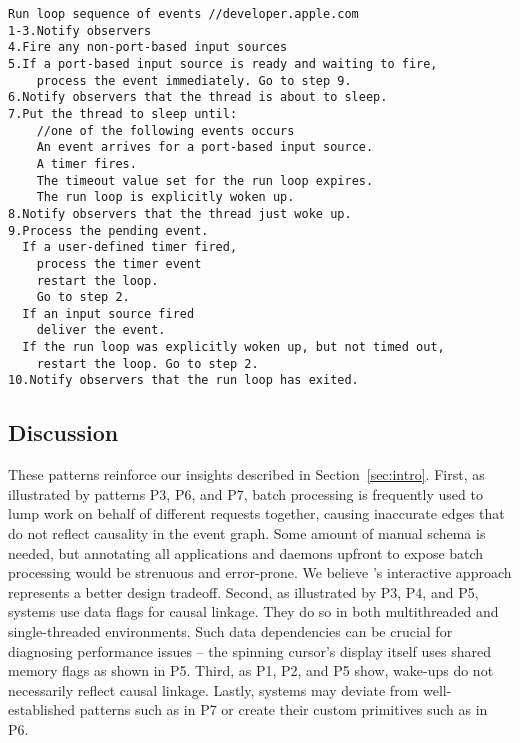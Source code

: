 
{\footnotesize \begin{verbatim}
Run loop sequence of events //developer.apple.com
1-3.Notify observers
4.Fire any non-port-based input sources
5.If a port-based input source is ready and waiting to fire,
    process the event immediately. Go to step 9.
6.Notify observers that the thread is about to sleep.
7.Put the thread to sleep until:
    //one of the following events occurs
    An event arrives for a port-based input source.
    A timer fires.
    The timeout value set for the run loop expires.
    The run loop is explicitly woken up.
8.Notify observers that the thread just woke up.
9.Process the pending event.
  If a user-defined timer fired,
    process the timer event
    restart the loop.
    Go to step 2.
  If an input source fired
    deliver the event.
  If the run loop was explicitly woken up, but not timed out,
    restart the loop. Go to step 2.
10.Notify observers that the run loop has exited.

\end{verbatim}
}




\subsection{Discussion}

These patterns reinforce our insights described in
Section~\ref{sec:intro}.  First, as illustrated by patterns P3, P6, and
P7, batch processing is frequently used to lump work on behalf of
different requests together, causing inaccurate edges that do not reflect
causality in the event graph.  Some amount of manual schema is needed, but
annotating all applications and daemons upfront to expose batch processing
would be strenuous and error-prone.  We believe \xxx's interactive
approach represents a better design tradeoff.  Second, as illustrated by
P3, P4, and P5, systems use data flags for causal linkage.  They do so in
both multithreaded and single-threaded environments.  Such data
dependencies can be crucial for diagnosing performance issues -- the
spinning cursor's display itself uses shared memory flags as shown in P5.
Third, as P1, P2, and P5 show, wake-ups do not necessarily reflect causal
linkage.  Lastly, systems may deviate from well-established patterns such
as in P7 or create their custom primitives such as in P6.
